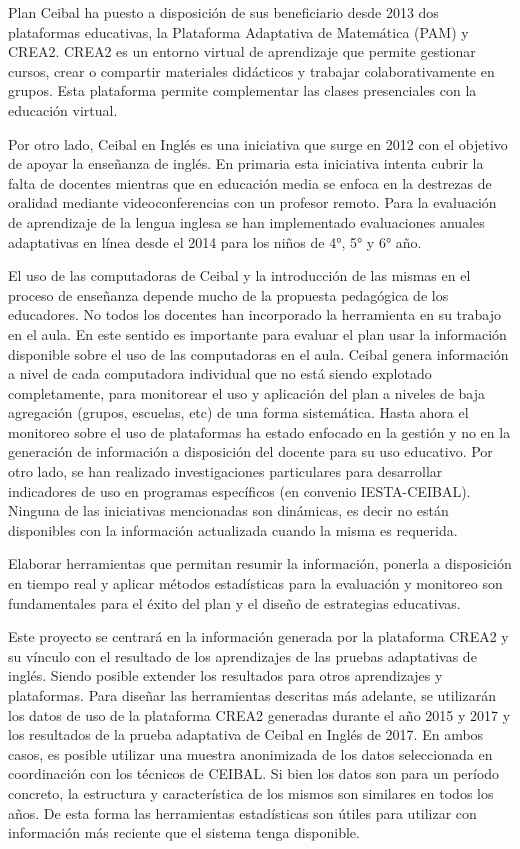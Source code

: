 \documentclass[msc,oneside,a4paper]{udelar}\usepackage[]{graphicx}\usepackage[]{color}
\begin{document}
Plan Ceibal ha puesto a disposición de sus beneficiario desde 2013 dos plataformas educativas, la Plataforma Adaptativa de Matemática (PAM) y CREA2. CREA2 es un entorno virtual de aprendizaje que permite gestionar cursos, crear o compartir materiales didácticos y trabajar colaborativamente en grupos. Esta plataforma permite complementar las clases presenciales con la educación virtual. 

Por otro lado, Ceibal en Inglés es una iniciativa que surge en 2012 con el objetivo de apoyar la enseñanza de inglés. En primaria esta iniciativa intenta cubrir la falta de docentes mientras que en educación media se enfoca en la destrezas de oralidad mediante videoconferencias con un profesor remoto. Para la evaluación de aprendizaje de la lengua inglesa se han implementado evaluaciones anuales adaptativas en línea desde el 2014 para los niños de 4°, 5° y 6° año.

El uso de las computadoras de Ceibal y la introducción de las mismas en el proceso de enseñanza depende mucho de la propuesta pedagógica de los educadores. No todos los docentes han incorporado la herramienta en su trabajo en el aula. En este sentido es importante para evaluar el plan usar la información disponible sobre el uso de las
computadoras en el aula. Ceibal genera información a nivel de cada computadora individual que no está siendo explotado completamente, para monitorear el uso y aplicación del plan a niveles de baja agregación (grupos, escuelas, etc) de una forma sistemática. Hasta ahora el monitoreo sobre el uso de plataformas ha estado enfocado en la gestión y no en la generación de información a disposición del docente para su uso educativo. Por otro lado, se han realizado investigaciones particulares para desarrollar indicadores de uso en programas específicos (en convenio IESTA-CEIBAL). Ninguna de las iniciativas mencionadas son dinámicas, es decir no están disponibles con la
información actualizada cuando la misma es requerida.

Elaborar herramientas que permitan resumir la información, ponerla a disposición en tiempo real y aplicar métodos estadísticas para la evaluación y monitoreo son fundamentales para el éxito del plan y el diseño de estrategias educativas.

Este proyecto se centrará en la información generada por la plataforma CREA2 y su vínculo con el resultado de los aprendizajes de las pruebas adaptativas de inglés. Siendo posible extender los resultados para otros aprendizajes y plataformas. Para diseñar las herramientas descritas más adelante, se utilizarán los datos de uso de la plataforma CREA2 generadas durante el año 2015 y 2017 y los resultados de la prueba adaptativa de Ceibal en Inglés de 2017. En ambos casos, es posible utilizar una muestra anonimizada de los datos seleccionada en coordinación con los técnicos de CEIBAL. Si bien los datos son para un período concreto, la estructura y característica de los mismos son similares en todos los años. De esta forma las herramientas estadísticas son útiles para utilizar con información más reciente que el sistema tenga disponible.
\end{document}
